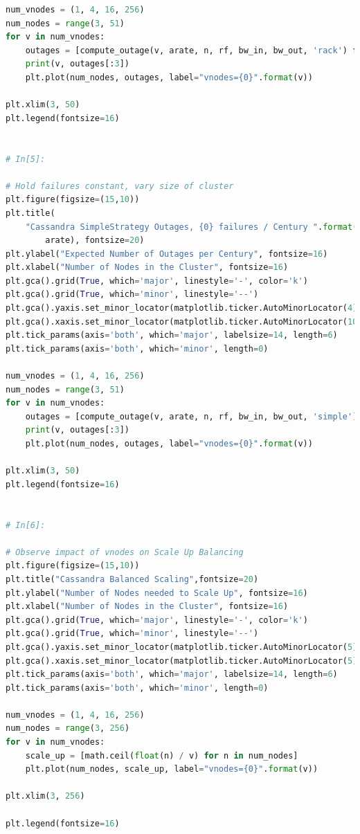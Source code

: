 \documentclass{article}
\begin{document}
\begin{lstlisting}[language=Python]
num_vnodes = (1, 4, 16, 256)
num_nodes = range(3, 51)
for v in num_vnodes:
    outages = [compute_outage(v, arate, n, rf, bw_in, bw_out, 'rack') for n in num_nodes]
    print(v, outages[:3])
    plt.plot(num_nodes, outages, label="vnodes={0}".format(v))

plt.xlim(3, 50)
plt.legend(fontsize=16)


# In[5]:

# Hold failures constant, vary size of cluster
plt.figure(figsize=(15,10))
plt.title(
    "Cassandra SimpleStrategy Outages, {0} failures / Century ".format(
        arate), fontsize=20)
plt.ylabel("Expected Number of Outages per Century", fontsize=16)
plt.xlabel("Number of Nodes in the Cluster", fontsize=16)
plt.gca().grid(True, which='major', linestyle='-', color='k')
plt.gca().grid(True, which='minor', linestyle='--')
plt.gca().yaxis.set_minor_locator(matplotlib.ticker.AutoMinorLocator(4))
plt.gca().xaxis.set_minor_locator(matplotlib.ticker.AutoMinorLocator(10))
plt.tick_params(axis='both', which='major', labelsize=14, length=6)
plt.tick_params(axis='both', which='minor', length=0)

num_vnodes = (1, 4, 16, 256)
num_nodes = range(3, 51)
for v in num_vnodes:
    outages = [compute_outage(v, arate, n, rf, bw_in, bw_out, 'simple') for n in num_nodes]
    print(v, outages[:3])
    plt.plot(num_nodes, outages, label="vnodes={0}".format(v))

plt.xlim(3, 50)
plt.legend(fontsize=16)


# In[6]:

# Observe impact of vnodes on Scale Up Balancing
plt.figure(figsize=(15,10))
plt.title("Cassandra Balanced Scaling",fontsize=20)
plt.ylabel("Number of Nodes needed to Scale Up", fontsize=16)
plt.xlabel("Number of Nodes in the Cluster", fontsize=16)
plt.gca().grid(True, which='major', linestyle='-', color='k')
plt.gca().grid(True, which='minor', linestyle='--')
plt.gca().yaxis.set_minor_locator(matplotlib.ticker.AutoMinorLocator(5))
plt.gca().xaxis.set_minor_locator(matplotlib.ticker.AutoMinorLocator(5))
plt.tick_params(axis='both', which='major', labelsize=14, length=6)
plt.tick_params(axis='both', which='minor', length=0)

num_vnodes = (1, 4, 16, 256)
num_nodes = range(3, 256)
for v in num_vnodes:
    scale_up = [math.ceil(float(n) / v) for n in num_nodes]
    plt.plot(num_nodes, scale_up, label="vnodes={0}".format(v))

plt.xlim(3, 256)

plt.legend(fontsize=16)



\end{lstlisting}
\end{document}
